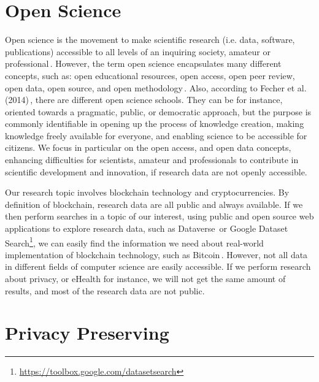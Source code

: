 \section{Open Science}
Open science is the movement to make scientific research (i.e. data, software, publications)
accessible to all levels of an inquiring society, amateur or professional\,\cite{woelfle2011openscience}.
However, the term open science encapsulates many different concepts, such as: open educational resources,
open access, open peer review, open data, open source, and open methodology\,\cite{Knoth2015}.
%
Also, according to Fecher et al. (2014)\,\cite{Fecher2014}, there are different open science schools.
They can be for instance, oriented towards a pragmatic, public, or democratic approach, but
the purpose is commonly identifiable in opening up the process of knowledge creation,
making knowledge freely available for everyone, and enabling science to be accessible for citizens.
%
We focus in particular on the open access, and open data concepts, enhancing difficulties for
scientists, amateur and professionals to contribute in scientific development and innovation, if research data are not
openly accessible.

Our research topic involves blockchain technology and cryptocurrencies.
By definition of blockchain, research data are all
public and always available. If we then perform searches in a topic of our interest, using
public and open source web applications to explore research data, such as Dataverse\,\cite{crosas2011dataverse} or
Google Dataset Search\footnote{\url{https://toolbox.google.com/datasetsearch}}, we can
easily find the information we need about real-world implementation of blockchain
technology, such as Bitcoin\,\cite{nakamoto2009bitcoin}.
%
However, not all data in different fields of computer science
are easily accessible. If we perform research about privacy, or eHealth for instance,
we will not get the same amount of results, and most of the research data are not public.
%



\section{Privacy Preserving}

